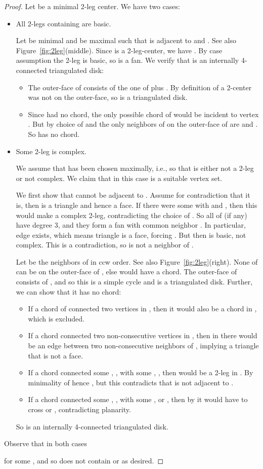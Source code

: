 \documentclass[12pt]{article}
\begin{document}
\begin{proof}
Let  be a minimal 2-leg center.
We have two cases:
\begin{itemize}
\item All 2-legs containing   are basic.

Let  be minimal and  be maximal such that  is adjacent
to  and .  
See also Figure~\ref{fig:2leg}(middle).
Since  is a 2-leg-center, we have .
By case assumption the 2-leg  is basic, so 
 is a fan. 
We verify that  is an internally 4-connected triangulated disk:
\begin{itemize}
\item The outer-face of  consists of the one of  plus .
	By definition of a 2-center  was not on the outer-face, so
	 is a triangulated disk.
\item Since  had no chord, the only possible chord of  would be
	incident to vertex .  But by choice of  and  the only
	neighbors of  on the outer-face of  are  and .  So
	 has no chord.
\end{itemize}


\item Some 2-leg  is complex.

We assume that  has been chosen maximally, i.e., so 
that  is
either not a 2-leg or not complex.
We claim that in this case  is a suitable vertex set.

We first show that  cannot be adjacent
to .  Assume for contradiction that it is, then  is
a triangle and hence a face.  If there were some 
with  and , then this would make
 a complex 2-leg, contradicting the choice of .
So all of  (if any) have degree 3, and they
form a fan with common neighbor .    In particular, edge 
exists, which means triangle  is a face, forcing
.  But then  is basic, not complex.
This is a contradiction, so  is not a neighbor of .

Let  be the neighbors of
 in ccw order.  
See also Figure~\ref{fig:2leg}(right).
None of  can be on the outer-face
of , else  would have a chord.  The outer-face of 
consists of , and so
this is a simple cycle and  is a triangulated disk.   Further, we
can show that it has no chord:
\begin{itemize}
\item If a chord of  connected two vertices in 
,
then it would also be a chord in , which is excluded.
\item If a chord connected two non-consecutive vertices in
, then in  there would be an edge between two
non-consecutive neighbors of , implying a triangle that is not a face.
\item If a chord connected some , , with some 
, , then  would be a 2-leg in .
By minimality of  hence , but this contradicts that  is
not adjacent to .
\item If a chord connected some , , with some 
,  or , then by  it would have to cross 
or , contradicting planarity.
\end{itemize}
So  is an internally 4-connected triangulated disk.  
\end{itemize}
Observe that in both cases

for some , and so  does not contain  or 
as desired.
\end{proof}
\end{document}
